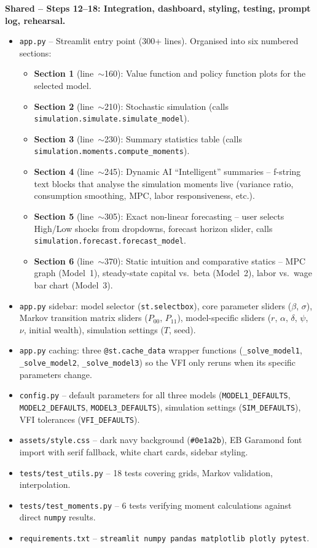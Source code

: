 \documentclass[11pt]{article}
\begin{document}
\begin{intuitbox}
\medskip
\textbf{Shared -- Steps 12--18: Integration, dashboard, styling, testing, prompt log, rehearsal.}
\begin{itemize}
    \item \texttt{app.py} -- Streamlit entry point (300+ lines). Organised into six numbered sections:
    \begin{itemize}
        \item \textbf{Section 1} (line~$\sim$160): Value function and policy function plots for the selected model.
        \item \textbf{Section 2} (line~$\sim$210): Stochastic simulation (calls \texttt{simulation.simulate.simulate\_model}).
        \item \textbf{Section 3} (line~$\sim$230): Summary statistics table (calls \texttt{simulation.moments.compute\_moments}).
        \item \textbf{Section 4} (line~$\sim$245): Dynamic AI ``Intelligent'' summaries -- f-string text blocks that analyse the simulation moments live (variance ratio, consumption smoothing, MPC, labor responsiveness, etc.).
        \item \textbf{Section 5} (line~$\sim$305): Exact non-linear forecasting -- user selects High/Low shocks from dropdowns, forecast horizon slider, calls \texttt{simulation.forecast.forecast\_model}.
        \item \textbf{Section 6} (line~$\sim$370): Static intuition and comparative statics -- MPC graph (Model~1), steady-state capital vs.\ beta (Model~2), labor vs.\ wage bar chart (Model~3).
    \end{itemize}
    \item \texttt{app.py} sidebar: model selector (\texttt{st.selectbox}), core parameter sliders ($\beta$, $\sigma$), Markov transition matrix sliders ($P_{00}$, $P_{11}$), model-specific sliders ($r$, $\alpha$, $\delta$, $\psi$, $\nu$, initial wealth), simulation settings ($T$, seed).
    \item \texttt{app.py} caching: three \texttt{@st.cache\_data} wrapper functions (\texttt{\_solve\_model1}, \texttt{\_solve\_model2}, \texttt{\_solve\_model3}) so the VFI only reruns when its specific parameters change.
    \item \texttt{config.py} -- default parameters for all three models (\texttt{MODEL1\_DEFAULTS}, \texttt{MODEL2\_DEFAULTS}, \texttt{MODEL3\_DEFAULTS}), simulation settings (\texttt{SIM\_DEFAULTS}), VFI tolerances (\texttt{VFI\_DEFAULTS}).
    \item \texttt{assets/style.css} -- dark navy background (\texttt{\#0e1a2b}), EB Garamond font import with serif fallback, white chart cards, sidebar styling.
    \item \texttt{tests/test\_utils.py} -- 18 tests covering grids, Markov validation, interpolation.
    \item \texttt{tests/test\_moments.py} -- 6 tests verifying moment calculations against direct \texttt{numpy} results.
    \item \texttt{requirements.txt} -- \texttt{streamlit numpy pandas matplotlib plotly pytest}.
\end{itemize}
\end{intuitbox}
\end{document}
